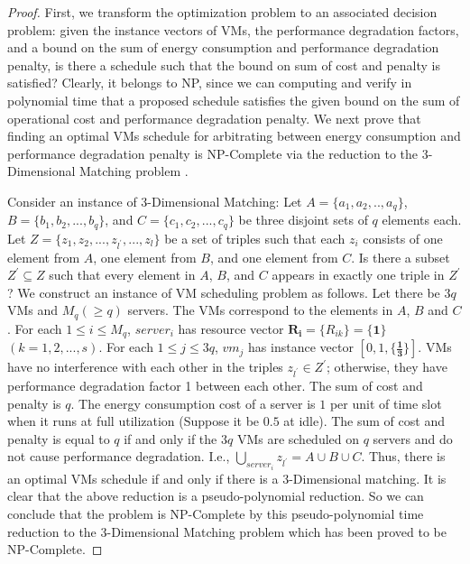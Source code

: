 \documentclass[10pt,journal]{IEEEtran}
\begin{document}
\begin{proof}
First, we transform the optimization problem to an associated decision problem: given the instance vectors of VMs, the performance degradation factors, and a bound on the sum of energy consumption and performance degradation penalty, is there a schedule such that the bound on sum of cost and penalty is satisfied? Clearly, it belongs to NP, since we can computing and verify in polynomial time that a proposed schedule satisfies the given bound on the sum of operational cost and performance degradation penalty. We next prove that finding an optimal VMs schedule for arbitrating between energy consumption and performance degradation penalty is NP-Complete via the reduction to the 3-Dimensional Matching problem \cite{Garey79, Leung04}.

Consider an instance of 3-Dimensional Matching: Let $A=\{a_1,a_2,..,a_q\}$, $B=\{b_1,b_2,...,b_q\}$, and $C=\{c_1,c_2,...,c_q\}$ be three disjoint sets of $q$ elements each. Let $Z=\{z_1,z_2,...,z_{l^{'}},...,z_{l}\}$ be a set of triples such that each $z_i$ consists of one element from $A$, one element from $B$, and one element from $C$. Is there a subset $Z^{'}{\subseteq}Z$ such that every element in $A$, $B$, and $C$ appears in exactly one triple in $Z^{'}$? We construct an instance of VM scheduling problem as follows. Let there be $3q$ VMs and $M_q({\geq}q)$ servers. The VMs correspond to the elements in $A$, $B$ and $C$. For each $1{\leq}i{\leq}M_q$, $server_i$ has resource vector $\bm{R_i}=\{R_{ik}\}=\{\bm{1}\}$ $(k=1,2,...,s)$. For each $1{\leq}j{\leq}3q$, $vm_j$ has instance vector $[0,1,\{\bm{\frac{1}{3}}\}]$. VMs have no interference with each other in the triples $z_{l^{'}}{\in}Z^{'}$; otherwise, they have performance degradation factor 1 between each other. The sum of cost and penalty is $q$. The energy consumption cost of a server is $1$ per unit of time slot when it runs at full utilization (Suppose it be $0.5$ at idle). The sum of cost and penalty is equal to $q$ if and only if the $3q$ VMs are scheduled on $q$ servers and do not cause performance degradation. I.e., $\bigcup\limits_{server_i}z_{l^{'}}=A{\cup}B{\cup}C$. Thus, there is an optimal VMs schedule if and only if there is a 3-Dimensional matching. It is clear that the above reduction is a pseudo-polynomial reduction. So we can conclude that the problem is NP-Complete by this pseudo-polynomial time reduction to the 3-Dimensional Matching problem which has been proved to be NP-Complete.
\end{proof}
\end{document}
